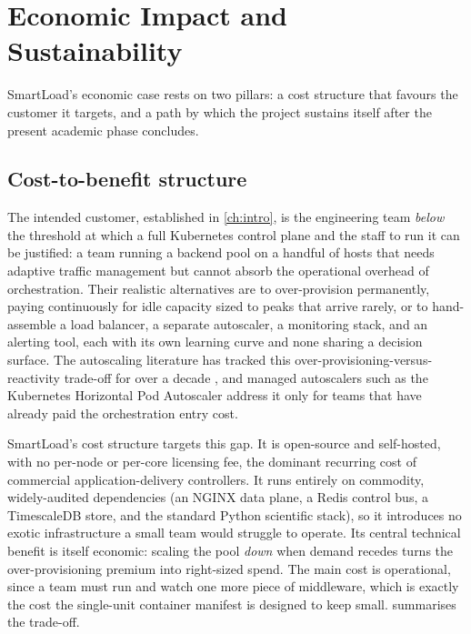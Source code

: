 \section{Economic Impact and Sustainability}
\label{disc:economic}

SmartLoad's economic case rests on two pillars: a cost structure that favours the
customer it targets, and a path by which the project sustains itself after the
present academic phase concludes.

\subsection{Cost-to-benefit structure}
\label{disc:cost_benefit}

The intended customer, established in \cref{ch:intro}, is the engineering team
\emph{below} the threshold at which a full Kubernetes control plane and the staff to
run it can be justified: a team running a backend pool on a handful of hosts that needs
adaptive traffic management but cannot absorb the operational overhead of
orchestration. Their realistic alternatives are to over-provision permanently, paying
continuously for idle capacity sized to peaks that arrive rarely, or to hand-assemble a
load balancer, a separate autoscaler, a monitoring stack, and an alerting tool, each
with its own learning curve and none sharing a decision surface. The autoscaling
literature has tracked this over-provisioning-versus-reactivity trade-off for over a
decade \cite{lorido2014autoscaling}, and managed autoscalers such as the Kubernetes
Horizontal Pod Autoscaler \cite{k8shpa} address it only for teams that have already
paid the orchestration entry cost.

SmartLoad's cost structure targets this gap. It is open-source and self-hosted, with no
per-node or per-core licensing fee, the dominant recurring cost of commercial
application-delivery controllers. It runs entirely on commodity, widely-audited
dependencies (an NGINX data plane, a Redis control bus, a TimescaleDB store, and the
standard Python scientific stack), so it introduces no exotic infrastructure a small
team would struggle to operate. Its central technical benefit is itself economic:
scaling the pool \emph{down} when demand recedes turns the over-provisioning premium
into right-sized spend. The main cost is operational, since a team must run and watch
one more piece of middleware, which is exactly the cost the single-unit container
manifest is designed to keep small.  summarises the
trade-off.

